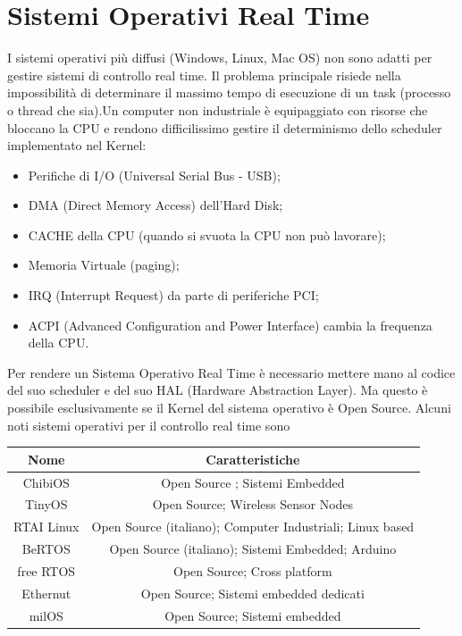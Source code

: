 \documentclass[10pt, letterpaper]{report}
\begin{document}
\section{Sistemi Operativi Real Time}
I sistemi operativi più diffusi (Windows, Linux, Mac OS) non sono adatti per gestire
sistemi di controllo real time. Il problema principale risiede nella impossibilità di determinare il massimo tempo
di esecuzione di un task (processo o thread che sia).Un computer non industriale è equipaggiato con risorse che bloccano la CPU e
rendono difficilissimo gestire il determinismo dello scheduler implementato nel Kernel:\begin{itemize}
    \item  Perifiche di I/O (Universal Serial Bus - USB);
    \item  DMA (Direct Memory Access) dell'Hard Disk;
    \item  CACHE della CPU (quando si svuota la CPU non può lavorare);
    \item  Memoria Virtuale (paging);
    \item  IRQ (Interrupt Request) da parte di periferiche PCI;
    \item  ACPI (Advanced Configuration and Power Interface) cambia la frequenza della CPU.
\end{itemize}
Per rendere un Sistema Operativo Real Time è necessario mettere mano al codice
del suo scheduler e del suo HAL (Hardware Abstraction Layer). Ma questo è possibile
esclusivamente se il Kernel del sistema operativo è Open Source. \acc 
Alcuni noti sistemi operativi per il controllo real time sono\begin{center}
    \begin{tabular}{|c|c|}
        \hline
        \rowcolor[HTML]{000000} 
        {\color[HTML]{FFFFFF} Nome} & {\color[HTML]{FFFFFF} Caratteristiche}                    \\ \hline
        ChibiOS                     & Open Source ; Sistemi Embedded                            \\ \hline
        TinyOS                      & Open Source; Wireless Sensor Nodes                        \\ \hline
        RTAI Linux                  & Open Source (italiano); Computer Industriali; Linux based \\ \hline
        BeRTOS                      & Open Source (italiano); Sistemi Embedded; Arduino         \\ \hline
        free RTOS                   & Open Source; Cross platform                               \\ \hline
        Ethernut                    & Open Source; Sistemi embedded dedicati                    \\ \hline
        milOS                       & Open Source; Sistemi embedded                             \\ \hline
        \end{tabular}
\end{center}\flowerLine 
\end{document}
